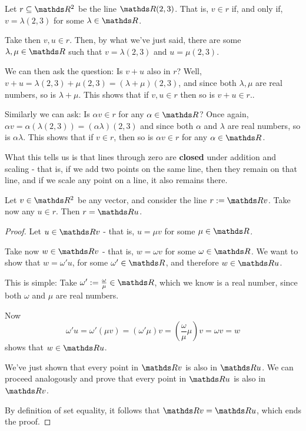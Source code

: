 \begin{ex}
	Let $r\subseteq \R^2$ be the line $\R(2,3)$. That is, $v\in r$ if, and only if, $v=\lambda (2,3)$ for some $\lambda\in \R$.
	
	Take then $v,u\in r$. Then, by what we've just said, there are some $\lambda,\mu\in \R$ such that $v=\lambda(2,3)$ and $u=\mu(2,3)$.
	
	We can then ask the question: Is $v+u$ also in $r$? Well, $v+u=\lambda(2,3)+\mu(2,3)=(\lambda+\mu)(2,3)$, and since both $\lambda,\mu$ are real numbers, so is $\lambda+\mu$. This shows that if $v,u\in r$ then so is $v+u\in r$..
	
	Similarly we can ask: Is $\alpha v\in r$ for any $\alpha\in \R$? Once again, $\alpha v=\alpha(\lambda (2,3))=(\alpha\lambda)(2,3)$ and since both $\alpha$ and $\lambda$ are real numbers, so is $\alpha\lambda$. This shows that if $v\in r$, then so is $\alpha v\in r$ for any $\alpha\in \R$.
	
	What this tells us is that lines through zero are \textbf{closed} under addition and scaling - that is, if we add two points on the same line, then they remain on that line, and if we scale any point on a line, it also remains there.
\end{ex}

\begin{prop}
	Let $v\in \R^2$ be any vector, and consider the line $r:=\R v$. Take now any $u\in r$. Then $r=\R u$.
\end{prop}
\begin{proof}
	Let $u\in \R v$ - that is, $u=\mu v$ for some $\mu\in \R$.
	
	Take now $w\in \R v$ - that is, $w=\omega v$ for some $\omega \in \R$. We want to show that $w=\omega' u$, for some $\omega'\in \R$, and therefore $w\in \R u$.
	
	\bigskip
	This is simple: Take $\omega':=\frac{\omega}{\mu}\in \R$, which we know is a real number, since both $\omega$ and $\mu$ are real numbers.
	
	Now \[\omega'u=\omega'\left(\mu v\right)=(\omega'\mu)v=\left(\frac{\omega}{\mu}\mu\right)v=\omega v=w\]shows that $w\in \R u$.
	
	We've just shown that every point in $\R v$ is also in $\R u$. We can proceed analogously and prove that every point in $\R u$ is also in $\R v$.
	
	By definition of set equality, it follows that $\R v=\R u$, which ends the proof.
\end{proof}

